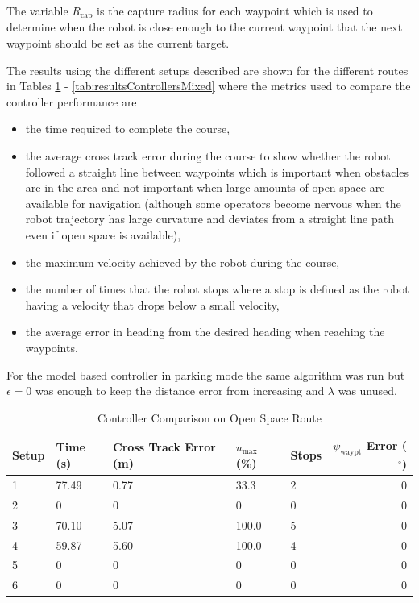 The variable $R_{\text{cap}}$ is the capture radius for each waypoint which is used to determine when the robot is close enough to the current waypoint that the next waypoint should be set as the current target.

The results using the different setups described are shown for the different routes in Tables \ref{tab:resultsControllersOpenSpace} - \ref{tab:resultsControllersMixed} where the metrics used to compare the controller performance are
\begin{itemize}
\item the time required to complete the course,
\item the average cross track error during the course to show whether the robot followed a straight line between waypoints which is important when obstacles are in the area and not important when large amounts of open space are available for navigation (although some operators become nervous when the robot trajectory has large curvature and deviates from a straight line path even if open space is available),
\item the maximum velocity achieved by the robot during the course,
\item the number of times that the robot stops where a stop is defined as the robot having a velocity that drops below a small velocity,
\item the average error in heading from the desired heading when reaching the waypoints.
\end{itemize}
For the model based controller in parking mode the same algorithm was run but $\epsilon=0$ was enough to keep the distance error from increasing and $\lambda$ was unused.

\begin{table}[ht!]
\caption{Controller Comparison on Open Space Route}
\small
\centering
\begin{tabular}{@{}lllllr@{}} \toprule
Setup & Time (s) & Cross Track Error (m) & $u_{\text{max}}$ (\%) & Stops & $\psi_{\text{waypt}}$ Error ($\left.^\circ\right.$) \\ \midrule
1     & 77.49    & 0.77                  & 33.3                  & 2     & 0 \\
2     & 0        & 0                     & 0                     & 0     & 0 \\
3     & 70.10    & 5.07                  & 100.0                 & 5     & 0 \\
4     & 59.87    & 5.60                  & 100.0                 & 4     & 0 \\
5     & 0        & 0                     & 0                     & 0     & 0 \\
6     & 0        & 0                     & 0                     & 0     & 0 \\ \bottomrule
\end{tabular}
\label{tab:resultsControllersOpenSpace}
\end{table}

